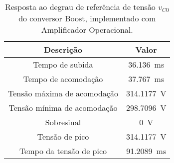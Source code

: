 \begin{table}[!ht]
\centering
\caption{Resposta ao degrau de referência de tensão $v_{C0}$ do conversor Boost, implementado com Amplificador Operacional.}
\label{tab:parametros}
\begin{tabular}{@{}cc@{}}
\toprule
\textbf{Descrição} & \textbf{Valor}\\ \midrule
Tempo de subida & \SI{36.136}{\milli\s}\\
Tempo de acomodação & \SI{37.767}{\milli\s}\\
Tensão máxima de acomodação & \SI{314.1177}{\V}\\
Tensão mínima de acomodação & \SI{298.7096}{\V}\\
Sobresinal & \SI{0}{\V}\\
Tensão de pico & \SI{314.1177}{\V}\\
Tempo da tensão de pico & \SI{91.2089}{\milli\s}\\
\bottomrule
\end{tabular}
\end{table}

